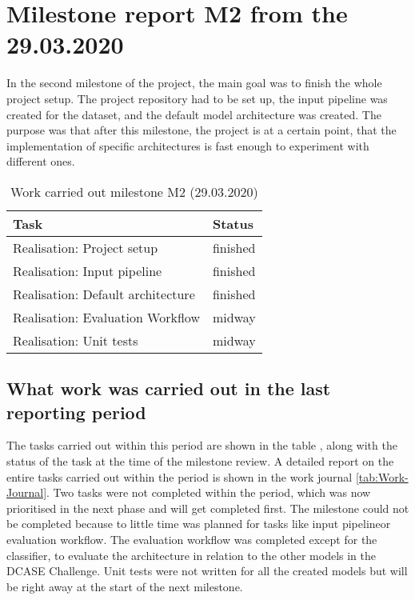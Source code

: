\section{Milestone report M2 from the 29.03.2020}
In the second milestone of the project, the main goal was to finish the whole project setup. The project repository had to be set up, the input pipeline was created for the dataset, and the default model architecture was created. The purpose was that after this milestone, the project is at a certain point, that the implementation of specific architectures is fast enough to experiment with different ones.

\begin{table}[htbp]
    \centering
    \caption{Work carried out milestone M2 (29.03.2020)}
	\label{tab:Work-Carried-Out-M2}
    \begin{tabular}{p{} | p{}}
        \toprule
        \textbf{Task} & \textbf{Status} \\ 
        \midrule[1pt]
        Realisation: Project setup & finished \\
        \hline
        Realisation: Input pipeline & finished \\
        \hline
        Realisation: Default architecture & finished \\
        \hline
        Realisation: Evaluation Workflow & midway \\
        \hline
        Realisation: Unit tests & midway \\
        \bottomrule
    \end{tabular}
\end{table}

\subsection{What work was carried out in the last reporting period}
The tasks carried out within this period are shown in the table , along with the status of the task at the time of the milestone review. A detailed report on the entire tasks carried out within the period is shown in the work journal \ref{tab:Work-Journal}. Two tasks were not completed within the period, which was now prioritised in the next phase and will get completed first. The milestone could not be completed because to little time was planned for tasks like \flqq input pipeline\frqq or \flqq evaluation workflow\frqq. The evaluation workflow was completed except for the classifier, to evaluate the architecture in relation to the other models in the DCASE Challenge. Unit tests were not written for all the created models but will be right away at the start of the next milestone.

